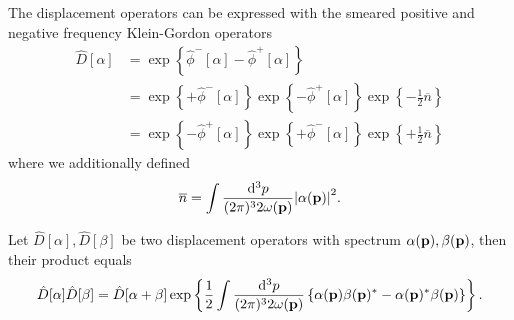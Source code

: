 \begin{lemma}\label{thm:displacement_operator_simplified}
	The displacement operators can be expressed with the smeared positive and negative frequency Klein-Gordon operators
	\begin{equation}
		\begin{split}
			\hat{D}[\alpha]
			&=
			\exp\left\{
				\hat\phi^-[\alpha]
				-
				\hat\phi^+[\alpha]
			\right\}
			\\
			&=
			\exp\left\{
				+\hat\phi^-[\alpha]
			\right\}
			\exp\left\{
				-\hat\phi^+[\alpha]
			\right\}
			\exp\left\{
				-
				\frac{1}{2}
				\overline{n}
			\right\}
			\\
			&=
			\exp\left\{
				-\hat\phi^+[\alpha]
			\right\}
			\exp\left\{
				+\hat\phi^-[\alpha]
			\right\}
			\exp\left\{
				+
				\frac{1}{2}
				\overline{n}
			\right\}
		\end{split}
	\end{equation}
	where we additionally defined
	\begin{equation}
		\overline{n}
		=
		\int\frac{\dd[3]{p}}{(2\pi)^32\omega(\vb{p})}
		\abs{\alpha(\vb{p})}^2
		.
	\end{equation}
\end{lemma}
\begin{lemma}\label{thm:displacement_operator_product}
	Let $\hat{D}[\alpha],\hat{D}[\beta]$ be two displacement operators with spectrum $\alpha(\vb{p}),\beta(\vb{p})$, then their product equals
	\begin{equation}
		\hat{D}[\alpha]
		\hat{D}[\beta]
		=
		\hat{D}[\alpha+\beta]
		\exp\left\{
			\frac{1}{2}
			\int\frac{\dd[3]{p}}{(2\pi)^32\omega(\vb{p})}
			\left\{
				\alpha(\vb{p})
				\beta(\vb{p})^*
				-
				\alpha(\vb{p})^*
				\beta(\vb{p})
			\right\}
		\right\}
		.
	\end{equation}
\end{lemma}
